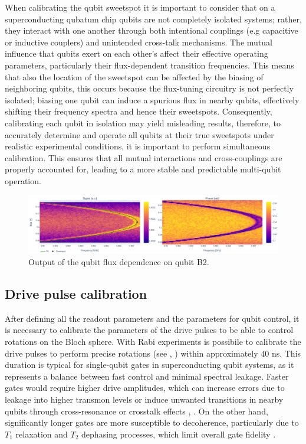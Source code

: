 When calibrating the qubit sweetspot it is important to consider that on a superconducting qubatum chip qubits are not completely isolated systems; rather, they interact with one another through both intentional couplings (e.g capacitive or inductive couplers) and unintended cross-talk mechanisms. 
The mutual influence that qubits exert on each other's affect their effective operating parameters, particularly their flux-dependent transition frequencies.
This means that also the location of the sweetspot can be affected by the biasing of neighboring qubits, this occurs because the flux-tuning circuitry is not perfectly isolated; biasing one qubit can induce a spurious flux in nearby qubits, effectively shifting their frequency spectra and hence their sweetspots.
Consequently, calibrating each qubit in isolation may yield misleading results, therefore, to accurately determine and operate all qubits at their true sweetspots under realistic experimental conditions, it is important to perform simultaneous calibration. 
This ensures that all mutual interactions and cross-couplings are properly accounted for, leading to a more stable and predictable multi-qubit operation.

\begin{figure}[h!]
    \centering
    \includegraphics[width=\textwidth]{figures/png/qubit_flux.png}
    \caption{Output of the qubit flux dependence on qubit B2.}
    \label{fig:qubit_flux}
\end{figure}

\subsection{Drive pulse calibration}\label{sec:Rabi}

After defining all the readout parameters and the parameters for qubit control, it is necessary to calibrate the parameters of the drive pulses to be able to control rotations on the Bloch sphere.
With Rabi experiments is possibile to calibrate the drive pulses to perform precise rotations (see \cite{Rabi1936}, \cite{Wallraff2005}) within approximately $40$ ns.
This duration is typical for single-qubit gates in superconducting qubit systems, as it represents a balance between fast control and minimal spectral leakage. 
Faster gates would require higher drive amplitudes, which can increase errors due to leakage into higher transmon levels or induce unwanted transitions in nearby qubits through cross-resonance or crosstalk effects \cite{TransmonPaper}, \cite{Motzoi_2009}. 
On the other hand, significantly longer gates are more susceptible to decoherence, particularly due to $T_1$ relaxation and $T_2$ dephasing processes, which limit overall gate fidelity \cite{Barends2014-pb}.

